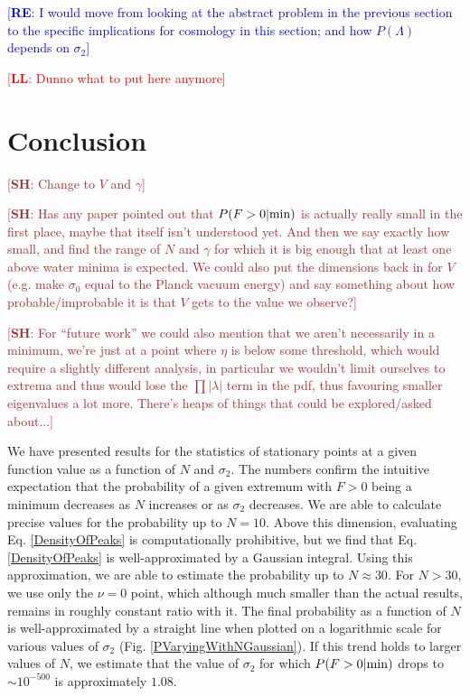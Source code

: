 \documentclass[12pt]{article}
\newcommand{\re}[1]{\textcolor{blue}{[{\bf RE}: #1]}}
\newcommand{\lfl}[1]{\textcolor{red}{[{\bf LL}: #1]}}
\newcommand{\SH}[1]{\textcolor{brown}{[{\bf SH}: #1]}}
\begin{document}
\re{I would move from looking at the abstract problem in the previous section to the specific implications for cosmology in this section; and how $P(\Lambda)$ depends on $\sigma_2$}

\lfl{Dunno what to put here anymore}

\section{Conclusion}
\SH{Change to $V$ and $\gamma$}

\SH{Has any paper pointed out that $P(F>0|{\rm min})$ is actually really small in the first place, maybe that itself isn't understood yet. And then we say exactly how small, and find the range of $N$ and $\gamma$ for which it is big enough that at least one above water minima is expected. We could also put the dimensions back in for $V$ (e.g. make $\sigma_0$ equal to the Planck vacuum energy)  and say something about how probable/improbable it is that $V$ gets to the value we observe?}

\SH{For ``future work'' we could also mention that we aren't necessarily in a minimum, we're just at a point where $\eta$ is below some threshold, which would require a slightly different analysis, in particular we wouldn't limit ourselves to extrema and thus would lose the $\prod |\lambda|$ term in the pdf, thus favouring smaller eigenvalues a lot more. There's heaps of things that could be explored/asked about...}


We have presented results for the statistics of stationary points at a given function value as a function of $N$ and $\sigma_2$. The numbers confirm the intuitive expectation that the probability of a given extremum with $F > 0$ being a minimum decreases as $N$ increases or as $\sigma_2$ decreases. We are able to calculate precise values for the probability up to $N=10$. Above this dimension, evaluating Eq. \ref{DensityOfPeaks} is computationally prohibitive, but we find that Eq. \ref{DensityOfPeaks} is well-approximated by a Gaussian integral. Using this approximation, we are able to estimate the probability up to $N \approx 30$. For $N>30$, we use only the $\nu=0$ point, which although much smaller than the actual results, remains in roughly constant ratio with it. The final probability as a function of $N$ is well-approximated by a straight line when plotted on a logarithmic scale for various values of $\sigma_2$ (Fig. \ref{PVaryingWithNGaussian}). If this trend holds to larger values of $N$, we estimate that the value of $\sigma_2$ for which $P(F>0|{\rm min})$ drops to $\sim 10^{-500}$ is approximately $1.08$.
\end{document}
